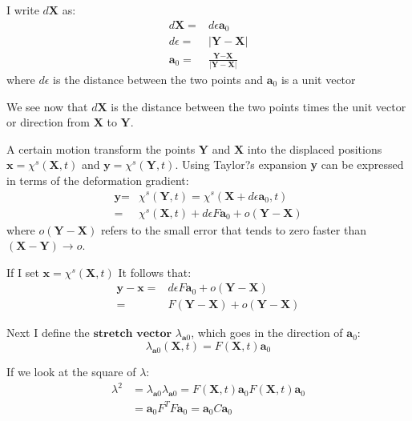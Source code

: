 I write $d\textbf{X}$ as:
\begin{align}
d\textbf{X} =& d\epsilon \textbf{a}_0\\
d\epsilon =& |\textbf{Y} - \textbf{X}| \\
\textbf{a}_0 =& \frac{\textbf{Y} - \textbf{X}}{|\textbf{Y} - \textbf{X}|}
\end{align}
where $d\epsilon$ is the distance between the two points and $\textbf{a}_0$ is a unit vector 

We see now that $d\textbf{X}$ is the distance between the two points times the unit vector or direction from $\textbf{X}$ to $\textbf{Y}$.
\newline

A certain motion transform the points $\textbf{Y}$ and $\textbf{X}$ into the displaced positions $\textbf{x} = \chi^s(\textbf{X},t)$ and $\textbf{y} = \chi^s(\textbf{Y},t)$. Using Taylor?s expansion \textbf{y} can be expressed in terms of the deformation gradient:
\begin{align}
\textbf{y} =& \chi^s(\textbf{Y},t) = \chi^s(\textbf{X} + d\epsilon \textbf{a}_0,t) \\
=& \chi^s(\textbf{X},t) + d\epsilon F \textbf{a}_0 + o(\textbf{Y}-\textbf{X}) 
\end{align}
where $o(\textbf{Y}-\textbf{X})$ refers to the small error that tends to zero faster than $(\textbf{X} - \textbf{Y}) \rightarrow o$. \newline

If I set $\textbf{x} = \chi^s(\textbf{X},t)$  It follows that:
\begin{align}
\textbf{y} - \textbf{x} =&  d\epsilon F \textbf{a}_0 + o(\textbf{Y}-\textbf{X}) \\
=& F(\textbf{Y} - \textbf{X}) + o(\textbf{Y}-\textbf{X}) 
\end{align}

Next I define the $\textbf{stretch vector}$ $\lambda_{\textbf{a}0}$, which goes in the direction of $\textbf{a}_0$: 
\begin{equation}
\lambda_{\textbf{a}0}(\textbf{X},t) = F(\textbf{X},t)\textbf{a}_0 
\end{equation}

If we look at the square of $\lambda$:
\begin{align}
\lambda^2 &=  \lambda_{\textbf{a}0} \lambda_{\textbf{a}0} = F(\textbf{X},t)\textbf{a}_0 F(\textbf{X},t)\textbf{a}_0 \\
&= \textbf{a}_0 F^TF\textbf{a}_0 = \textbf{a}_0 C \textbf{a}_0
\end{align}

